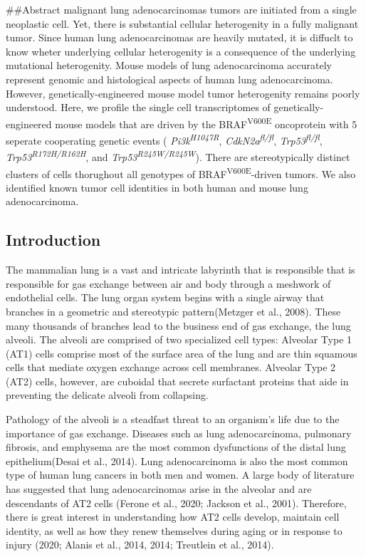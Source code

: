 \#\#Abstract
malignant lung adenocarcinomas tumors are initiated from a single neoplastic cell. Yet, there is substantial cellular heterogenity in a fully malignant tumor. Since human lung adenocarcinomas are heavily mutated, it is diffuclt to know wheter underlying cellular heterogenity is a consequence of the underlying mutational heterogenity. Mouse models of lung adenocarcinoma accurately represent genomic and histological aspects of human lung adenocarcinoma. However, genetically-engineered mouse model tumor heterogenity remains poorly understood. Here, we profile the single cell transcriptomes of genetically-engineered mouse models that are driven by the BRAF\textsuperscript{V600E} oncoprotein with 5 seperate cooperating genetic events ( \emph{Pi3k\textsuperscript{H1047R}}, \emph{CdkN2a\textsuperscript{fl/fl}}, \emph{Trp53\textsuperscript{fl/fl}}, \emph{Trp53\textsuperscript{R172H/R162H}}, and \emph{Trp53\textsuperscript{R245W/R245W}}). There are stereotypically distinct clusters of cells thorughout all genotypes of BRAF\textsuperscript{V600E}-driven tumors. We also identified known tumor cell identities in both human and mouse lung adenocarcinoma.

\hypertarget{introduction-2}{%
\subsection{Introduction}\label{introduction-2}}

The mammalian lung is a vast and intricate labyrinth that is responsible that is responsible for gas exchange between air and body through a meshwork of endothelial cells. The lung organ system begins with a single airway that branches in a geometric and stereotypic pattern(Metzger et al., 2008). These many thousands of branches lead to the business end of gas exchange, the lung alveoli. The alveoli are comprised of two specialized cell types: Alveolar Type 1 (AT1) cells comprise most of the surface area of the lung and are thin squamous cells that mediate oxygen exchange across cell membranes. Alveolar Type 2 (AT2) cells, however, are cuboidal that secrete surfactant proteins that aide in preventing the delicate alveoli from collapsing.

Pathology of the alveoli is a steadfast threat to an organism's life due to the importance of gas exchange. Diseases such as lung adenocarcinoma, pulmonary fibrosis, and emphysema are the most common dysfunctions of the distal lung epithelium(Desai et al., 2014). Lung adenocarcinoma is also the most common type of human lung cancers in both men and women. A large body of literature has suggested that lung adenocarcinomas arise in the alveolar and are descendants of AT2 cells (Ferone et al., 2020; Jackson et al., 2001). Therefore, there is great interest in understanding how AT2 cells develop, maintain cell identity, as well as how they renew themselves during aging or in response to injury (2020; Alanis et al., 2014, 2014; Treutlein et al., 2014).


